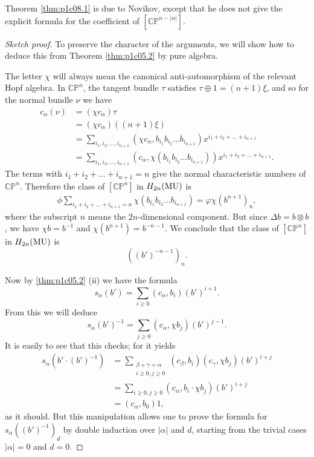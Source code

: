 \documentclass[../main]{subfiles}
\begin{document}
Theorem \ref{thm:p1c08.1} is due to Novikov, except that he does not give the explicit formula for the coefficient of $[\mathbb{CP}^{n-|\alpha|}]$.
\begin{proof}[Sketch proof]
To preserve the character of the arguments, we will show how to deduce this from Theorem \ref{thm:p1c05.2} by pure algebra.

The letter $\chi$ will always mean the canonical anti-automorphism of the relevant Hopf algebra. In $\mathbb{CP}^n$, the tangent bundle $\tau$ satisfies $\tau \oplus 1 = (n+1)\xi$, and so for the normal bundle $\nu$ we have
\begin{align*}
    c_\alpha (\nu) &= (\chi c_\alpha)\tau \\
    &= (\chi c_\alpha)((n+1)\xi) \\
    &= \sum_{i_1,i_2,\dots,i_{n+1}} (\chi c_\alpha , b_{i_1} b_{i_2} \dots b_{i_{n+1}})x^{i_1 + i_2 + \dots + i_{n+1}} \\
    &= \sum_{i_1,i_2,\dots,i_{n+1}} (c_\alpha , \chi(b_{i_1} b_{i_2} \dots b_{i_{n+1}}))x^{i_1 + i_2 + \dots + i_{n+1}}.
\end{align*}
The terms with $i_1 + i_2 + \dots + i_{n+1} = n$ give the normal characteristic numbers of $\mathbb{CP}^n$. Therefore the class of $[\mathbb{CP}^n]$ in $H_{2n}(\mathrm{MU})$ is 
\begin{align*}
    \phi \sum_{i_1 + i_2 + \dots + i_{n+1} = n}  \chi(b_{i_1} b_{i_2} \dots b_{i_{n+1}}) = \varphi \chi(b^{n+1})_n,
\end{align*}
where the subscript $n$ means the $2n$-dimensional component. But since $\Delta b = b \otimes b$, we have $\chi b = b^{-1}$ and $\chi(b^{n+1}) = b^{-n-1}$. We conclude that the class of $[\mathbb{CP}^n]$ in $H_{2n}(\mathrm{MU})$ is 
\[((b')^{-n-1})_n.\]

Now by \ref{thm:p1c05.2} (ii) we have the formula
\[s_\alpha(b') = \sum_{i \geq 0}(c_\alpha,b_i)(b')^{i+1}.\]
From this we will deduce
\begin{equation}
    \label{eqn:p1c08.2} s_\alpha (b')^{-1} = \sum_{j \geq 0} (c_\alpha, \chi b_j)(b')^{j-1}.
\end{equation}
It is easily to see that this checks; for it yields
\begin{align*}
    s_\alpha(b' \cdot (b')^{-1}) &= \sum_{\substack{\beta + \gamma = \alpha \\ i \geq 0, j \geq 0}} (c_\beta,b_i)(c_\gamma,\chi b_j)(b')^{i+j} \\
    &= \sum_{i \geq 0, j \geq 0} (c_\alpha, b_i \cdot \chi b_j)(b')^{i+j} \\
    &= (c_\alpha, b_0)1,
\end{align*}
as it should. But this manipulation allows one to prove the formula for $s_\alpha((b')^{-1})_d$ by double induction over $|\alpha|$ and $d$, starting from the trivial cases $|\alpha| = 0$ and $d = 0$.


\end{proof}
\end{document}
